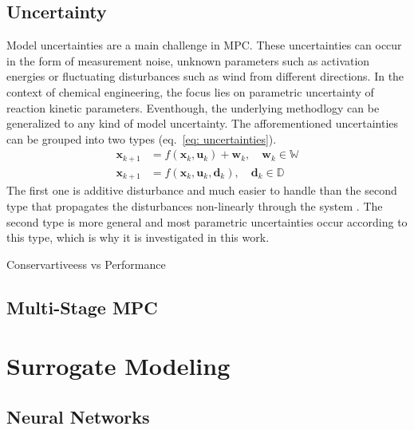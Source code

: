 \section{Uncertainty}
Model uncertainties are a main challenge in MPC. These uncertainties can occur in the form of measurement noise, unknown parameters such as 
activation energies or fluctuating disturbances such as wind from different directions. In the context of chemical engineering, the
focus lies on parametric uncertainty of reaction kinetic parameters. Eventhough, the underlying methodlogy can be generalized to any kind of 
model uncertainty.
\newline
The afforementioned uncertainties can be grouped into two types (eq.~\ref{eq: uncertainties}).
\begin{equation}
    \label{eq: uncertainties}
    \begin{aligned}
        \bm{x}_{k+1} &= f(\bm{x}_k, \bm{u}_k) + \bm{w}_k, \quad \bm{w}_k \in \mathbb{W}
        \\
        \bm{x}_{k+1} &= f(\bm{x}_k, \bm{u}_k, \bm{d}_k), \quad \bm{d}_k \in \mathbb{D}
    \end{aligned}
\end{equation}
The first one is additive disturbance and much easier to handle than the second type that propagates the disturbances non-linearly
through the system \cite{empty000}. The second type is more general and most parametric uncertainties occur according to this type, which is why
it is investigated in this work. 

Conservartiveess vs Performance

\section{Multi-Stage MPC}








\chapter{Surrogate Modeling}

\section{Neural Networks}

